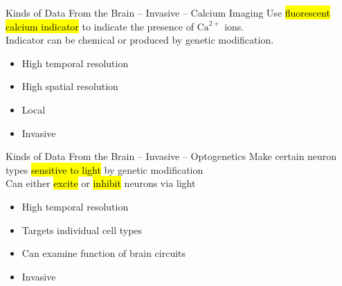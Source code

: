 \documentclass[handout,aspectratio=169]{beamer}
\begin{document}
\begin{frame}{Kinds of Data From the Brain -- Invasive -- Calcium Imaging}
	\vspace{0.5cm}
	Use \hl{fluorescent calcium indicator} to indicate the presence of $\mathrm{Ca}^{2+}$ ions.\\[0.125cm]
	Indicator can be chemical or produced by genetic modification.
	\begin{multicols}{2}
	\begin{itemize}
		\setlength\itemsep{0.25cm}
		\item[\OPlus] High temporal resolution
		\item[\OPlus] High spatial resolution
		\item[\OMinus] Local
		\item[\OMinus] Invasive
	\end{itemize}
	\end{multicols}
\end{frame}

\begin{frame}{Kinds of Data From the Brain -- Invasive -- Optogenetics}
	\vspace{0.5cm}
	Make certain neuron types \hl{sensitive to light} by genetic modification\\[0.25cm]
	Can either \hl{excite} or \hl{inhibit} neurons via light
	\begin{multicols}{2}
		\begin{itemize}
			\setlength\itemsep{0.25cm}
			\item[\OPlus] High temporal resolution
			\item[\OPlus] Targets individual cell types
			\item[\OPlus] Can examine function of brain circuits
		\end{itemize}
		\columnbreak
		\begin{itemize}
			\setlength\itemsep{0.25cm}
			\item[\OMinus] Invasive
		\end{itemize}
	\end{multicols}
\end{frame}

\end{document}

